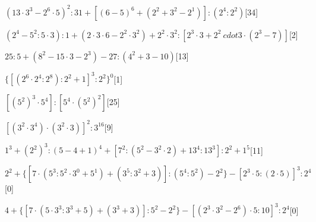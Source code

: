 \begin{esercizio} %
\((13\cdot3^3-2^6\cdot5)^2:31+[(6-5)^6+(2^2+3^2-2^1)]:(2^4:2^2)\)\hfill[34]
\end{esercizio}
\begin{esercizio} %
\((2^4-5^2:5\cdot3):1+(2\cdot3\cdot6-2^2\cdot3^2)+2^2\cdot3^2:[2^3\cdot3+2^2\
cdot3\cdot(2^3-7)]\)\hfill[2]
\end{esercizio}
\begin{esercizio} %
\(25:5+(8^2-15\cdot3-2^3)-27:(4^2+3-10)\)\hfill[13]
\end{esercizio}
\begin{esercizio} %
\(\{[(2^6\cdot2^4:2^8):2^2+1]^3:2^2\}^0\)\hfill[1]
\end{esercizio}
\begin{esercizio} %
\([(5^2)^3\cdot5^4]:[5^4\cdot(5^2)^2]\)\hfill[25]
\end{esercizio}
\begin{esercizio} %
\([(3^2\cdot3^4)\cdot(3^2\cdot3)]^2:3^{16}\)\hfill[9]
\end{esercizio}
\begin{esercizio} %
\(1^3+(2^2)^3:(5-4+1)^4+[7^2:(5^2-3^2\cdot2)+13^4:13^3]:2^2+1^5\)\hfill[11]
\end{esercizio}
\begin{esercizio} %
\(2^2+\{[7\cdot(5^3:5^2\cdot3^0+5^1)+(3^5:3^2+3)]:(5^4:5^2)-2^2\}-[2^3\cdot5:(
2\cdot5)]^3:2^4\)\hfill[0]
\end{esercizio}
% 
\(4+\{[7\cdot(5\cdot3^3:3^3+5)+(3^3+3)]:5^2-2^2\}-[(2^3\cdot3^2-2^6)\cdot5:10]
^3:2^4\)\hfill[0]

\subsubsection*{}

